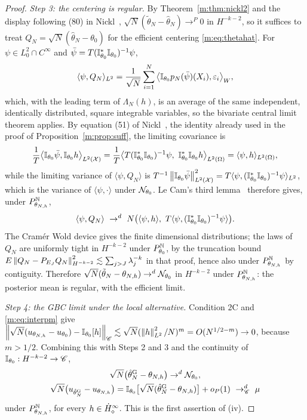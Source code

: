 \begin{proof}
\emph{Step 3: the centering is regular.} By Theorem~\ref{m:thm:nickl2} and the display following (80) in Nickl~\cite{nicklbvm2024}, $\sqrt N(\tilde\theta_N-\hat\theta_N)\to^P0$ in $H^{-k-2}$, so it suffices to treat $Q_N=\sqrt N(\hat\theta_N-\theta_0)$ for the efficient centering \eqref{m:eq:thetahat}. For $\psi\in L^2_0\cap C^\infty$ and $\bar\psi=T(\mathbb{I}^*_{\theta_0}\mathbb{I}_{\theta_0})^{-1}\psi$,
\[
\langle\psi,Q_N\rangle_{L^2}=\frac1{\sqrt N}\sum_{i=1}^N\big\langle\mathbb{I}_{\theta_0}p_N(\bar\psi)(X_i),\varepsilon_i\big\rangle_W ,
\]
which, with the leading term of $\Lambda_N(h)$, is an average of the same independent, identically distributed, square integrable variables, so the bivariate central limit theorem applies. By equation (51) of Nickl~\cite{nicklbvm2024}, the identity already used in the proof of Proposition~\ref{m:prop:suff}, the limiting covariance is
\[
\frac1T\big\langle\I_{\theta_0}\bar\psi,\I_{\theta_0}h\big\rangle_{L^2(\mathcal X)}=\frac1T\big\langle T(\I^*_{\theta_0}\I_{\theta_0})^{-1}\psi,\ \I^*_{\theta_0}\I_{\theta_0}h\big\rangle_{L^2(\Omega)}=\langle\psi,h\rangle_{L^2(\Omega)} ,
\]
while the limiting variance of $\langle\psi,Q_N\rangle$ is $T^{-1}\left\|\mathbb{I}_{\theta_0}\bar\psi\right\|^2_{L^2(\mathcal X)}=T\langle\psi,(\mathbb{I}^*_{\theta_0}\mathbb{I}_{\theta_0})^{-1}\psi\rangle_{L^2}$, which is the variance of $\langle\psi,\cdot\rangle$ under $\mathcal{N}_{\theta_0}$. Le Cam's third lemma~\cite[Example 6.7]{vandervaart1998} therefore gives, under $P^{\mathbb{N}}_{\theta_{N,h}}$,
\[
\langle\psi,Q_N\rangle\ \to^d\ N\big(\langle\psi,h\rangle,\ T\langle\psi,(\I^*_{\theta_0}\I_{\theta_0})^{-1}\psi\rangle\big).
\]
The Cram\'er Wold device gives the finite dimensional distributions; the laws of $Q_N$ are uniformly tight in $H^{-k-2}$ under $P^{\mathbb{N}}_{\theta_0}$, by the truncation bound $E\left\|Q_N-P_{E_J}Q_N\right\|^2_{H^{-k-2}}\lesssim\sum_{j>J}\lambda_j^{-k}$ in that proof, hence also under $P^{\mathbb{N}}_{\theta_{N,h}}$ by contiguity. Therefore $\sqrt N(\tilde\theta_N-\theta_{N,h})\to^d\mathcal{N}_{\theta_0}$ in $H^{-k-2}$ under $P^{\mathbb{N}}_{\theta_{N,h}}$: the posterior mean is regular, with the efficient limit.

\emph{Step 4: the GBC limit under the local alternative.} Condition 2C and \eqref{m:eq:interpm} give $\left\|\sqrt N(u_{\theta_{N,h}}-u_{\theta_0})-\mathbb{I}_{\theta_0}[h]\right\|_{\mathscr{C}}\lesssim\sqrt N(\left\|h\right\|^2_{L^2}/N)^m=O(N^{1/2-m})\to0$, because $m>1/2$. Combining this with Steps 2 and 3 and the continuity of $\mathbb{I}_{\theta_0}:H^{-k-2}\to\mathscr{C}$,
\[
\begin{gathered}
\sqrt N\big(\hat\theta^{\rm G}_N-\theta_{N,h}\big)\to^d\mathcal{N}_{\theta_0},\\
\sqrt N\big(u_{\hat\theta^{\rm G}_N}-u_{\theta_{N,h}}\big)=\mathbb{I}_{\theta_0}\big[\sqrt N(\hat\theta^{\rm G}_N-\theta_{N,h})\big]+o_P(1)\ \to^d_{\mathscr{C}}\ \mu
\end{gathered}
\]
under $P^{\mathbb{N}}_{\theta_{N,h}}$, for every $h\in\dot H^{\infty}_\diamond$. This is the first assertion of (iv).


\end{proof}
